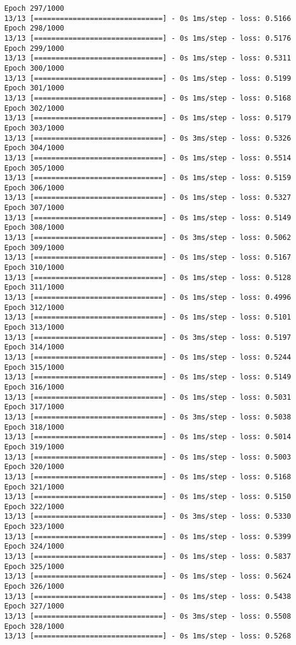 \documentclass[11pt]{article}
\begin{document}
\begin{Verbatim}[commandchars=\\\{\}]
Epoch 297/1000
13/13 [==============================] - 0s 1ms/step - loss: 0.5166
Epoch 298/1000
13/13 [==============================] - 0s 1ms/step - loss: 0.5176
Epoch 299/1000
13/13 [==============================] - 0s 1ms/step - loss: 0.5311
Epoch 300/1000
13/13 [==============================] - 0s 1ms/step - loss: 0.5199
Epoch 301/1000
13/13 [==============================] - 0s 1ms/step - loss: 0.5168
Epoch 302/1000
13/13 [==============================] - 0s 1ms/step - loss: 0.5179
Epoch 303/1000
13/13 [==============================] - 0s 3ms/step - loss: 0.5326
Epoch 304/1000
13/13 [==============================] - 0s 1ms/step - loss: 0.5514
Epoch 305/1000
13/13 [==============================] - 0s 1ms/step - loss: 0.5159
Epoch 306/1000
13/13 [==============================] - 0s 1ms/step - loss: 0.5327
Epoch 307/1000
13/13 [==============================] - 0s 1ms/step - loss: 0.5149
Epoch 308/1000
13/13 [==============================] - 0s 3ms/step - loss: 0.5062
Epoch 309/1000
13/13 [==============================] - 0s 1ms/step - loss: 0.5167
Epoch 310/1000
13/13 [==============================] - 0s 1ms/step - loss: 0.5128
Epoch 311/1000
13/13 [==============================] - 0s 1ms/step - loss: 0.4996
Epoch 312/1000
13/13 [==============================] - 0s 1ms/step - loss: 0.5101
Epoch 313/1000
13/13 [==============================] - 0s 3ms/step - loss: 0.5197
Epoch 314/1000
13/13 [==============================] - 0s 1ms/step - loss: 0.5244
Epoch 315/1000
13/13 [==============================] - 0s 1ms/step - loss: 0.5149
Epoch 316/1000
13/13 [==============================] - 0s 1ms/step - loss: 0.5031
Epoch 317/1000
13/13 [==============================] - 0s 3ms/step - loss: 0.5038
Epoch 318/1000
13/13 [==============================] - 0s 1ms/step - loss: 0.5014
Epoch 319/1000
13/13 [==============================] - 0s 1ms/step - loss: 0.5003
Epoch 320/1000
13/13 [==============================] - 0s 1ms/step - loss: 0.5168
Epoch 321/1000
13/13 [==============================] - 0s 1ms/step - loss: 0.5150
Epoch 322/1000
13/13 [==============================] - 0s 3ms/step - loss: 0.5330
Epoch 323/1000
13/13 [==============================] - 0s 1ms/step - loss: 0.5399
Epoch 324/1000
13/13 [==============================] - 0s 1ms/step - loss: 0.5837
Epoch 325/1000
13/13 [==============================] - 0s 1ms/step - loss: 0.5624
Epoch 326/1000
13/13 [==============================] - 0s 1ms/step - loss: 0.5438
Epoch 327/1000
13/13 [==============================] - 0s 3ms/step - loss: 0.5508
Epoch 328/1000
13/13 [==============================] - 0s 1ms/step - loss: 0.5268

\end{Verbatim}
\end{document}
